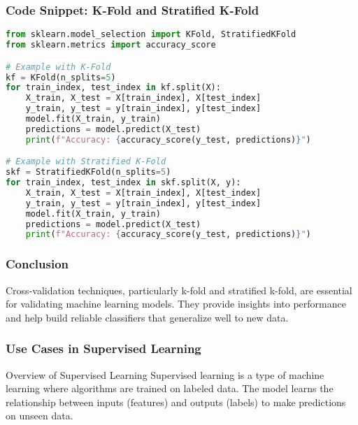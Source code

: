 \documentclass[aspectratio=169]{beamer}
\begin{document}
\begin{frame}[fragile]
    \frametitle{Code Snippet: K-Fold and Stratified K-Fold}
    \begin{lstlisting}[language=Python]
from sklearn.model_selection import KFold, StratifiedKFold
from sklearn.metrics import accuracy_score

# Example with K-Fold
kf = KFold(n_splits=5)
for train_index, test_index in kf.split(X):
    X_train, X_test = X[train_index], X[test_index]
    y_train, y_test = y[train_index], y[test_index]
    model.fit(X_train, y_train)
    predictions = model.predict(X_test)
    print(f"Accuracy: {accuracy_score(y_test, predictions)}")

# Example with Stratified K-Fold
skf = StratifiedKFold(n_splits=5)
for train_index, test_index in skf.split(X, y):
    X_train, X_test = X[train_index], X[test_index]
    y_train, y_test = y[train_index], y[test_index]
    model.fit(X_train, y_train)
    predictions = model.predict(X_test)
    print(f"Accuracy: {accuracy_score(y_test, predictions)}")
    \end{lstlisting}
\end{frame}

\begin{frame}
    \frametitle{Conclusion}
    Cross-validation techniques, particularly k-fold and stratified k-fold, are essential for validating machine learning models. They provide insights into performance and help build reliable classifiers that generalize well to new data.
\end{frame}

\begin{frame}
    \frametitle{Use Cases in Supervised Learning}
    \begin{block}{Overview of Supervised Learning}
        Supervised learning is a type of machine learning where algorithms are trained on labeled data. The model learns the relationship between inputs (features) and outputs (labels) to make predictions on unseen data.
    \end{block}
\end{frame}
\end{document}
